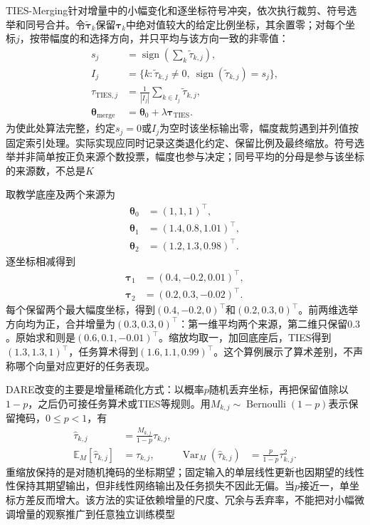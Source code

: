 TIES-Merging针对增量中的小幅变化和逐坐标符号冲突，依次执行裁剪、符号选举和同号合并。令$\widetilde{\bm{\tau}}_k$保留$\bm{\tau}_k$中绝对值较大的给定比例坐标，其余置零；对每个坐标$j$，按带幅度的和选择方向，并只平均与该方向一致的非零值：
\begin{equation}
  \begin{aligned}
    s_j&=\operatorname{sign}\!\left(\sum_k\widetilde{\tau}_{k,j}\right),\\
    I_j&=\{k:\widetilde{\tau}_{k,j}\neq0,\
                    \operatorname{sign}(\widetilde{\tau}_{k,j})=s_j\},\\
    \tau_{\mathrm{TIES},j}
      &=\frac{1}{|I_j|}\sum_{k\in I_j}\widetilde{\tau}_{k,j},\\
    \bm{\theta}_{\mathrm{merge}}
      &=\bm{\theta}_0+\lambda\bm{\tau}_{\mathrm{TIES}}.
  \end{aligned}
  \label{eq:ket-integration-ties}
\end{equation}
为使此处算法完整，约定$s_j=0$或$I_j$为空时该坐标输出零，幅度裁剪遇到并列值按固定索引处理。实际实现应同时记录这类退化约定、保留比例及最终缩放。符号选举并非简单按正负来源个数投票，幅度也参与决定；同号平均的分母是参与该坐标的来源数，不总是$K$

取教学底座及两个来源为
\[
  \begin{aligned}
    \bm{\theta}_0&=(1,1,1)^\top,\\
    \bm{\theta}_1&=(1.4,0.8,1.01)^\top,\\
    \bm{\theta}_2&=(1.2,1.3,0.98)^\top.
  \end{aligned}
\]
逐坐标相减得到
\[
  \begin{aligned}
    \bm{\tau}_1&=(0.4,-0.2,0.01)^\top,\\
    \bm{\tau}_2&=(0.2,0.3,-0.02)^\top.
  \end{aligned}
\]
每个保留两个最大幅度坐标，得到$(0.4,-0.2,0)^\top$和$(0.2,0.3,0)^\top$。前两维选举方向均为正，合并增量为$(0.3,0.3,0)^\top$：第一维平均两个来源，第二维只保留$0.3$。原始求和则是$(0.6,0.1,-0.01)^\top$。缩放均取一，加回底座后，TIES得到$(1.3,1.3,1)^\top$，任务算术得到$(1.6,1.1,0.99)^\top$。这个算例展示了算术差别，不声称哪个向量对应更好的任务表现。

DARE改变的主要是增量稀疏化方式：以概率$p$随机丢弃坐标，再把保留值除以$1-p$，之后仍可接任务算术或TIES等规则。用$M_{k,j}\sim\operatorname{Bernoulli}(1-p)$表示保留掩码，$0\leq p<1$，有
\begin{equation}
  \begin{aligned}
    \widehat{\tau}_{k,j}&=\frac{M_{k,j}}{1-p}\tau_{k,j},\\
    \mathbb{E}_M[\widehat{\tau}_{k,j}]&=\tau_{k,j},&
    \operatorname{Var}_M(\widehat{\tau}_{k,j})
      &=\frac{p}{1-p}\tau_{k,j}^{2}.
  \end{aligned}
  \label{eq:ket-integration-dare}
\end{equation}
重缩放保持的是对随机掩码的坐标期望；固定输入的单层线性更新也因期望的线性性保持其期望输出，但非线性网络输出及任务损失不因此无偏。当$p$接近一，单坐标方差反而增大。该方法的实证依赖增量的尺度、冗余与丢弃率，不能把对小幅微调增量的观察推广到任意独立训练模型

